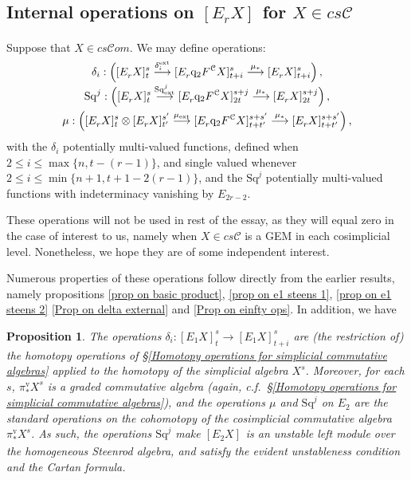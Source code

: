 \documentclass[11pt]{amsart} \renewcommand{\baselinestretch}{1.2}
\theoremstyle{plain}
\newtheorem{prop}[thm]{Proposition}
\theoremstyle{definition}
\renewcommand{\to}{\longrightarrow}
\newcommand{\scrC}{\mathscr{C}}
\newcommand{\calc}{\mathcal{C}}
\newcommand{\quadgrad}[1]{\mathrm{q}_{#1}}
\newcommand{\Sq}{\mathrm{Sq}}
\newcommand{\algs}{{\scrC\!\textit{om}}}
\newcommand{\E}[5]{[E^{#1}_{#2}#3]^{#4}_{#5}}
\newcommand{\Edownup}[5]{[E_{#1}^{#2}#3]^{#4}_{#5}}
\newcommand{\uver}{^\mathrm{v}}
\begin{document}
\begin{second quadrant homotopy sseq operations}
\subsection{Internal operations on $\E{}{r}{X}{}{}$ for $X\in cs\calc$}
\label{The case of a cosimplicial simplicial commutative algebra}
Suppose that $X\in cs\algs$. We may define operations:
\begin{gather*}
\delta_i:\left(\Edownup{r}{}{X}{s}{t} \smash{{}\overset{\delta_i^\textup{ext}}{\to}{}} \Edownup{r}{}{\quadgrad{2}F^\calc X}{s}{t+i}\overset{\mu_*}{\to} 
\Edownup{r}{}{X}{s}{t+i}\right),
\\
\Sq^j:\left(\Edownup{r}{}{X}{s}{t}   \smash{{}\overset{\Sq^j_\textup{ext}}{\to}{}} \Edownup{r}{}{\quadgrad{2}F^\calc X}{s+j}{2t}\overset{\mu_*}{\to} 
\Edownup{r}{}{X}{s+j}{2t}\right),\\
\mu:\left(\Edownup{r}{}{X}{s}{t}\otimes \Edownup{r}{}{X}{s'}{t'}\smash{{}\overset{\mu_\textup{ext}}{\to}{}} \Edownup{r}{}{\quadgrad{2}F^\calc X}{s+s'}{t+t'}\overset{\mu_*}{\to} 
\Edownup{r}{}{X}{s+s'}{t+t'}\right),
\end{gather*}
with the $\delta_i$ potentially multi-valued functions,  defined when $2\leq i\leq \max\{n,t-(r-1)\}$, and single valued whenever $2\leq i\leq\min\{n+1,t+1-2(r-1)\}$, and the $\Sq^j$ potentially multi-valued functions with indeterminacy vanishing by $E_{2r-2}$. 

These operations will not be used in rest of the essay, as they will equal zero in the case of interest to us, namely when $X\in cs\calc$ is a GEM in each cosimplicial level. Nonetheless, we hope they are of some independent interest. 

Numerous properties of these operations follow directly from the earlier results, namely propositions \ref{prop on basic product}, \ref{prop on e1 steens 1}, \ref{prop on e1 steens 2} \ref{Prop on delta external} and \ref{Prop on einfty ops}. In addition, we have


\begin{prop}
\label{final generic prop for basic sseq ops}
The operations $\delta_i:\Edownup{1}{}{X}{s}{t}\to \Edownup{1}{}{X}{s}{t+i}$
are (the restriction of) the homotopy operations of \S\ref{Homotopy operations for simplicial commutative algebras} applied to the homotopy of the simplicial algebra $X^{s}$. Moreover, for each $s$, $\pi\uver_*X^s$ is a graded commutative algebra (again, c.f.\ \S\ref{Homotopy operations for simplicial commutative algebras}), and the operations $\mu$ and $\Sq^j$ on $E_2$ are the standard operations on the cohomotopy of the cosimplicial commutative algebra $\pi\uver_*X^s$. As such, the operations $\Sq^j$ make $\Edownup{2}{}{X}{}{}$ is an unstable left module over the homogeneous Steenrod algebra, and satisfy the evident unstableness condition and the Cartan formula.


\end{prop}
\end{second quadrant homotopy sseq operations}
\end{document}
